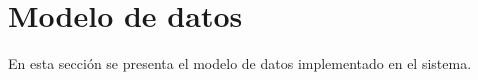



\section{Modelo de datos}

En esta sección se presenta el modelo de datos implementado en el sistema.



